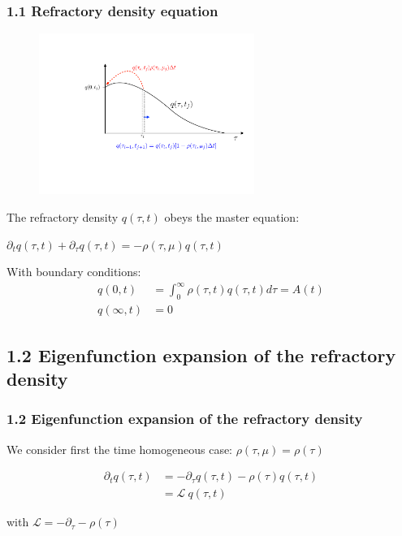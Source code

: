 \documentclass{beamer}
\begin{document}
\begin{frame}
\frametitle{1.1 Refractory density equation}


 \begin{figure}
	\centering
	
	\includegraphics[width=70mm]{qtau}
	
\end{figure}


The refractory density $q(\tau,t)$ obeys the master equation:

\vspace{0.3cm}
\hspace{2.5cm}$
\partial_t q(\tau,t)+ \partial_\tau q(\tau,t)=-\rho(\tau,\mu)q(\tau,t)
$


\vspace{0.3cm}
With boundary conditions:
\begin{align}
\label{boundarycondition}
q(0,t)&=\int_{0}^{\infty}\rho(\tau,t)q(\tau,t)d\tau=A(t) \nonumber\\
q(\infty,t)&=0 \nonumber
\end{align}

\end{frame}


\subsection{1.2 Eigenfunction expansion of the refractory density}

\begin{frame}
\frametitle{1.2 Eigenfunction expansion of the refractory density}

We consider first the time homogeneous case: $\rho(\tau,\mu)=\rho(\tau)$

\vspace{0.2cm}
\hspace{2.9cm}
\begin{align*}
\partial_t q(\tau,t)&=-\partial_\tau q(\tau,t)-\rho(\tau)q(\tau,t) \\
&=\mathcal{L}\:q(\tau,t)
\end{align*}


\vspace{0.5cm}
\hspace{2.5cm}  with $\mathcal{L}=-\partial_{\tau}-\rho(\tau)$ 



\end{frame}
\end{document}

